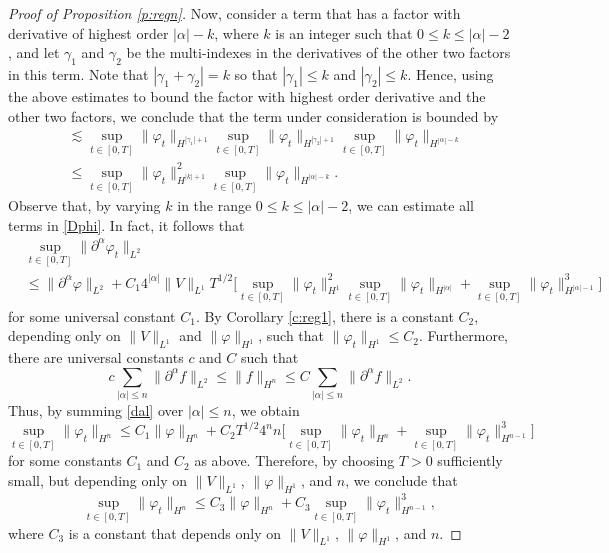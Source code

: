 \documentclass[11pt,a4paper]{scrartcl}
\begin{document}
\begin{proof}[Proof of Proposition \ref{p:regn}]
  Now, consider a term that has a factor with derivative of highest order
  $|\alpha| - k$, where $k$ is an integer such that $0 \le k \le |\alpha| -
  2$, and let $\gamma_1$ and $\gamma_2$ be the multi-indexes in the
  derivatives of the other two factors in this term. Note that $|\gamma_1 +
  \gamma_2|=k$ so that $|\gamma_1| \le k$ and $|\gamma_2| \le k$. Hence, using
  the above estimates to bound the factor with highest order derivative and
  the other two factors, we conclude that the term under consideration is
  bounded by
  \begin{align*}
    & \apprle \sup_{t \in [0,T]} \| \varphi_t \|_{H^{|\gamma_1|+1}} \sup_{t
    \in [0,T]} \| \varphi_t \|_{H^{|\gamma_2|+1}} \sup_{t \in [0,T]} \|
    \varphi_t \|_{H^{|\alpha|-k}} \\
    & \le \sup_{t \in [0,T]} \| \varphi_t \|_{H^{|k|+1}}^2 \sup_{t \in [0,T]}
    \| \varphi_t \|_{H^{|\alpha|-k}}.
  \end{align*}
  Observe that, by varying $k$ in the range $0 \le k \le |\alpha|-2$, we can
  estimate all terms in \eqref{Dphi}. In fact, it follows that
  \begin{equation} \label{dal}
    \begin{split}
      & \sup_{t \in [0,T]} \| \partial^\alpha \varphi_t \|_{L^2} \\
      & \le \| \partial^\alpha \varphi \|_{L^2} + C_1 4^{|\alpha|} \| V
      \|_{L^1} T^{1/2} \Big[ \sup_{t \in [0,T]} \| \varphi_t \|_{H^1}^2
      \sup_{t \in [0,T]} \| \varphi_t \|_{H^{|\alpha|}} + \sup_{t \in [0,T]}
      \| \varphi_t \|_{H^{|\alpha|-1}}^3 \Big]
    \end{split}
  \end{equation}
  for some universal constant $C_1$. By Corollary \ref{c:reg1}, there is a
  constant $C_2$, depending only on $\| V \|_{L^1}$ and $\| \varphi \|_{H^1}$,
  such that $\| \varphi_t \|_{H^1} \le C_2$. Furthermore, there are universal
  constants $c$ and $C$ such that
  \[
    c \sum_{|\alpha| \le n} \| \partial^\alpha f \|_{L^2} \le \| f \|_{H^n}
    \le C \sum_{|\alpha| \le n} \| \partial^\alpha f \|_{L^2}.
  \]
  Thus, by summing \eqref{dal} over $|\alpha| \le n$, we obtain
  \[
    \sup_{t \in [0,T]} \| \varphi_t \|_{H^n} \le C_1 \| \varphi \|_{H^n} + C_2
    T^{1/2} 4^n n \Big[ \sup_{t \in [0,T]} \| \varphi_t \|_{H^n} + \sup_{t \in
    [0,T]} \| \varphi_t \|_{H^{n-1}}^3 \Big]
  \]
  for some constants $C_1$ and $C_2$ as above. Therefore, by choosing $T > 0$
  sufficiently small, but depending only on $\| V \|_{L^1}$, $\| \varphi
  \|_{H^1}$, and $n$, we conclude that
  \[
    \sup_{t \in [0,T]} \| \varphi_t \|_{H^n} \le C_3 \| \varphi \|_{H^n} + C_3
    \sup_{t \in [0,T]} \| \varphi_t \|_{H^{n-1}}^3,
  \]
  where $C_3$ is a constant that depends only on $\| V \|_{L^1}$, $\| \varphi
  \|_{H^1}$, and $n$.
\end{proof}
\end{document}
